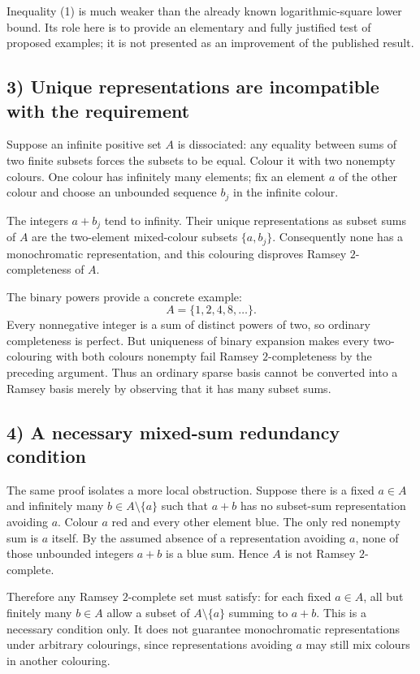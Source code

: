Inequality (1) is much weaker than the already known logarithmic-square lower bound. Its role here is to provide an elementary and fully justified test of proposed examples; it is not presented as an improvement of the published result.

\subsection*{3) Unique representations are incompatible with the requirement}
Suppose an infinite positive set $A$ is dissociated: any equality between sums of two finite subsets forces the subsets to be equal. Colour it with two nonempty colours. One colour has infinitely many elements; fix an element $a$ of the other colour and choose an unbounded sequence $b_j$ in the infinite colour.

The integers $a+b_j$ tend to infinity. Their unique representations as subset sums of $A$ are the two-element mixed-colour subsets $\{a,b_j\}$. Consequently none has a monochromatic representation, and this colouring disproves Ramsey $2$-completeness of $A$.

The binary powers provide a concrete example:
\[
 A=\{1,2,4,8,\ldots\}.
\]
Every nonnegative integer is a sum of distinct powers of two, so ordinary completeness is perfect. But uniqueness of binary expansion makes every two-colouring with both colours nonempty fail Ramsey $2$-completeness by the preceding argument. Thus an ordinary sparse basis cannot be converted into a Ramsey basis merely by observing that it has many subset sums.

\subsection*{4) A necessary mixed-sum redundancy condition}
The same proof isolates a more local obstruction. Suppose there is a fixed $a\in A$ and infinitely many $b\in A\setminus\{a\}$ such that $a+b$ has no subset-sum representation avoiding $a$. Colour $a$ red and every other element blue. The only red nonempty sum is $a$ itself. By the assumed absence of a representation avoiding $a$, none of those unbounded integers $a+b$ is a blue sum. Hence $A$ is not Ramsey $2$-complete.

Therefore any Ramsey $2$-complete set must satisfy: for each fixed $a\in A$, all but finitely many $b\in A$ allow a subset of $A\setminus\{a\}$ summing to $a+b$. This is a necessary condition only. It does not guarantee monochromatic representations under arbitrary colourings, since representations avoiding $a$ may still mix colours in another colouring.

